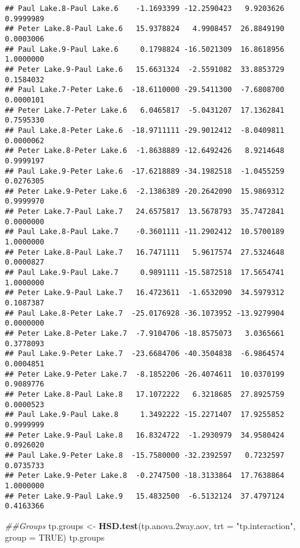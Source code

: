 \documentclass[]{article}
\newenvironment{Shaded}{\begin{snugshade}}{\end{snugshade}}
\newcommand{\CommentTok}[1]{\textcolor[rgb]{0.56,0.35,0.01}{\textit{#1}}}
\newcommand{\DataTypeTok}[1]{\textcolor[rgb]{0.13,0.29,0.53}{#1}}
\newcommand{\FloatTok}[1]{\textcolor[rgb]{0.00,0.00,0.81}{#1}}
\newcommand{\KeywordTok}[1]{\textcolor[rgb]{0.13,0.29,0.53}{\textbf{#1}}}
\newcommand{\NormalTok}[1]{#1}
\newcommand{\OtherTok}[1]{\textcolor[rgb]{0.56,0.35,0.01}{#1}}
\newcommand{\StringTok}[1]{\textcolor[rgb]{0.31,0.60,0.02}{#1}}
\begin{document}
\begin{verbatim}
## Paul Lake.8-Paul Lake.6    -1.1693399 -12.2590423   9.9203626 0.9999989
## Peter Lake.8-Paul Lake.6   15.9378824   4.9908457  26.8849190 0.0003006
## Paul Lake.9-Paul Lake.6     0.1798824 -16.5021309  16.8618956 1.0000000
## Peter Lake.9-Paul Lake.6   15.6631324  -2.5591082  33.8853729 0.1584032
## Paul Lake.7-Peter Lake.6  -18.6110000 -29.5411300  -7.6808700 0.0000101
## Peter Lake.7-Peter Lake.6   6.0465817  -5.0431207  17.1362841 0.7595330
## Paul Lake.8-Peter Lake.6  -18.9711111 -29.9012412  -8.0409811 0.0000062
## Peter Lake.8-Peter Lake.6  -1.8638889 -12.6492426   8.9214648 0.9999197
## Paul Lake.9-Peter Lake.6  -17.6218889 -34.1982518  -1.0455259 0.0276305
## Peter Lake.9-Peter Lake.6  -2.1386389 -20.2642090  15.9869312 0.9999970
## Peter Lake.7-Paul Lake.7   24.6575817  13.5678793  35.7472841 0.0000000
## Paul Lake.8-Paul Lake.7    -0.3601111 -11.2902412  10.5700189 1.0000000
## Peter Lake.8-Paul Lake.7   16.7471111   5.9617574  27.5324648 0.0000827
## Paul Lake.9-Paul Lake.7     0.9891111 -15.5872518  17.5654741 1.0000000
## Peter Lake.9-Paul Lake.7   16.4723611  -1.6532090  34.5979312 0.1087387
## Paul Lake.8-Peter Lake.7  -25.0176928 -36.1073952 -13.9279904 0.0000000
## Peter Lake.8-Peter Lake.7  -7.9104706 -18.8575073   3.0365661 0.3778093
## Paul Lake.9-Peter Lake.7  -23.6684706 -40.3504838  -6.9864574 0.0004851
## Peter Lake.9-Peter Lake.7  -8.1852206 -26.4074611  10.0370199 0.9089776
## Peter Lake.8-Paul Lake.8   17.1072222   6.3218685  27.8925759 0.0000523
## Paul Lake.9-Paul Lake.8     1.3492222 -15.2271407  17.9255852 0.9999999
## Peter Lake.9-Paul Lake.8   16.8324722  -1.2930979  34.9580424 0.0926020
## Paul Lake.9-Peter Lake.8  -15.7580000 -32.2392597   0.7232597 0.0735733
## Peter Lake.9-Peter Lake.8  -0.2747500 -18.3133864  17.7638864 1.0000000
## Peter Lake.9-Paul Lake.9   15.4832500  -6.5132124  37.4797124 0.4163366
\end{verbatim}

\begin{Shaded}
\begin{Highlighting}[]
\CommentTok{##Groups}
\NormalTok{tp.groups <-}\StringTok{ }\KeywordTok{HSD.test}\NormalTok{(tp.anova}\FloatTok{.2}\NormalTok{way.aov, }\DataTypeTok{trt =} \StringTok{"tp.interaction"}\NormalTok{, }\DataTypeTok{group =} \OtherTok{TRUE}\NormalTok{)}
\NormalTok{tp.groups}
\end{Highlighting}
\end{Shaded}
\end{document}
